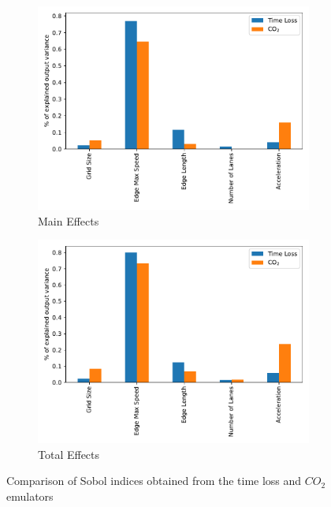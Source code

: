 \documentclass{article}
\begin{document}
\begin{figure}[b!]
    \centering
    \begin{subfigure}[b]{0.49\textwidth}
        \centering
        \includegraphics[width=\textwidth]{images/main_effects.pdf}
        \caption{Main Effects}
        \label{fig:main_effects}
    \end{subfigure}
    \hfill
    \begin{subfigure}[b]{0.49\textwidth}
        \centering
        \includegraphics[width=\textwidth]{images/total_effects.pdf}
        \caption{Total Effects}
        \label{fig:total_effects}
    \end{subfigure}
    \caption{Comparison of Sobol indices obtained from the time loss and $CO_2$ emulators}
    \label{fig:sobol}
\end{figure}
\end{document}
